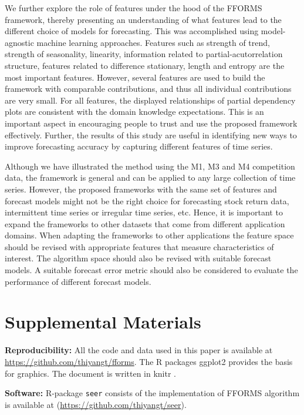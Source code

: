 \documentclass[11pt,a4paper,]{article}
\begin{document}
We further explore the role of features under the hood of the FFORMS framework, thereby presenting an understanding of what features lead to the different choice of models for forecasting. This was accomplished using model-agnostic machine learning approaches. Features such as strength of trend, strength of seasonality, linearity, information related to partial-acutorrelation structure, features related to difference stationary, length and entropy are the most important features. However, several features are used to build the framework with comparable contributions, and thus all individual contributions are very small. For all features, the displayed relationships of partial dependency plots are consistent with the domain knowledge expectations. This is an important aspect in encouraging people to trust and use the proposed framework effectively. Further, the results of this study are useful in identifying new ways to improve forecasting accuracy by capturing different features of time series.

Although we have illustrated the method using the M1, M3 and M4 competition data, the framework is general and can be applied to any large collection of time series. However, the proposed frameworks with the same set of features and forecast
models might not be the right choice for forecasting stock return data, intermittent time series or irregular
time series, etc. Hence, it is important to expand the frameworks to other datasets that come from different application domains. When adapting the frameworks to other applications the feature space should be revised with appropriate features that measure characteristics of interest. The algorithm space should also be revised with suitable forecast models. A suitable forecast error metric should also be considered to evaluate the performance of different forecast models.

\hypertarget{supplemental-materials}{%
\section*{Supplemental Materials}\label{supplemental-materials}}

\textbf{Reproducibility:} All the code and data used in this paper is available at \url{https://github.com/thiyangt/fforms}. The R packages ggplot2 \autocite{ggplot} provides the basis for graphics. The document is written in knitr \autocite{xie2017dynamic}.

\textbf{Software:} R-package \texttt{seer} consists of the implementation of FFORMS algorithm is available at (\url{https://github.com/thiyangt/seer}).
\end{document}
